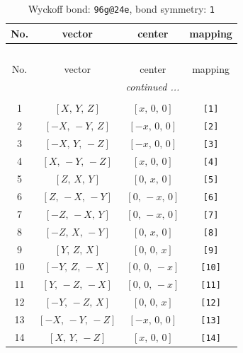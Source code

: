 \documentclass[fleqn,8pt]{jsarticle}
\begin{document}
\begin{longtable}{cccc}
\caption{Wyckoff bond: {\tt 96g@24e}, bond symmetry: {\tt 1}}
 \\
 \hline \hline
No. & vector & center & mapping \\ \hline \endfirsthead

\multicolumn{3}{l}{\tablename\ \thetable{}} \\
 \hline \hline
No. & vector & center & mapping \\ \hline \endhead

 \hline \hline
\multicolumn{3}{r}{\footnotesize\it continued ...} \\ \endfoot

 \hline \hline
\multicolumn{3}{r}{} \\ \endlastfoot

1 & $\left[ X,\, Y,\, Z \right]$ & $\left[ x,\, 0,\, 0 \right]$ & {\tt [1]} \\ \hline
2 & $\left[ - X,\, - Y,\, Z \right]$ & $\left[ - x,\, 0,\, 0 \right]$ & {\tt [2]} \\ \hline
3 & $\left[ - X,\, Y,\, - Z \right]$ & $\left[ - x,\, 0,\, 0 \right]$ & {\tt [3]} \\ \hline
4 & $\left[ X,\, - Y,\, - Z \right]$ & $\left[ x,\, 0,\, 0 \right]$ & {\tt [4]} \\ \hline
5 & $\left[ Z,\, X,\, Y \right]$ & $\left[ 0,\, x,\, 0 \right]$ & {\tt [5]} \\ \hline
6 & $\left[ Z,\, - X,\, - Y \right]$ & $\left[ 0,\, - x,\, 0 \right]$ & {\tt [6]} \\ \hline
7 & $\left[ - Z,\, - X,\, Y \right]$ & $\left[ 0,\, - x,\, 0 \right]$ & {\tt [7]} \\ \hline
8 & $\left[ - Z,\, X,\, - Y \right]$ & $\left[ 0,\, x,\, 0 \right]$ & {\tt [8]} \\ \hline
9 & $\left[ Y,\, Z,\, X \right]$ & $\left[ 0,\, 0,\, x \right]$ & {\tt [9]} \\ \hline
10 & $\left[ - Y,\, Z,\, - X \right]$ & $\left[ 0,\, 0,\, - x \right]$ & {\tt [10]} \\ \hline
11 & $\left[ Y,\, - Z,\, - X \right]$ & $\left[ 0,\, 0,\, - x \right]$ & {\tt [11]} \\ \hline
12 & $\left[ - Y,\, - Z,\, X \right]$ & $\left[ 0,\, 0,\, x \right]$ & {\tt [12]} \\ \hline
13 & $\left[ - X,\, - Y,\, - Z \right]$ & $\left[ - x,\, 0,\, 0 \right]$ & {\tt [13]} \\ \hline
14 & $\left[ X,\, Y,\, - Z \right]$ & $\left[ x,\, 0,\, 0 \right]$ & {\tt [14]} \\ \hline

\end{longtable}
\end{document}
